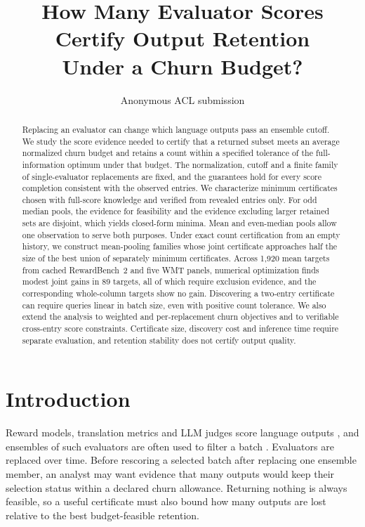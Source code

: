 \documentclass[11pt]{article}
\title{How Many Evaluator Scores Certify Output Retention\\ Under a Churn Budget?}
\author{Anonymous ACL submission}
\begin{document}
\maketitle

\begin{abstract}
Replacing an evaluator can change which language outputs pass an ensemble cutoff. We study the score evidence needed to certify that a returned subset meets an average normalized churn budget and retains a count within a specified tolerance of the full-information optimum under that budget. The normalization, cutoff and a finite family of single-evaluator replacements are fixed, and the guarantees hold for every score completion consistent with the observed entries. We characterize minimum certificates chosen with full-score knowledge and verified from revealed entries only. For odd median pools, the evidence for feasibility and the evidence excluding larger retained sets are disjoint, which yields closed-form minima. Mean and even-median pools allow one observation to serve both purposes. Under exact count certification from an empty history, we construct mean-pooling families whose joint certificate approaches half the size of the best union of separately minimum certificates. Across 1,920 mean targets from cached RewardBench~2 and five WMT panels, numerical optimization finds modest joint gains in 89 targets, all of which require exclusion evidence, and the corresponding whole-column targets show no gain. Discovering a two-entry certificate can require queries linear in batch size, even with positive count tolerance. We also extend the analysis to weighted and per-replacement churn objectives and to verifiable cross-entry score constraints. Certificate size, discovery cost and inference time require separate evaluation, and retention stability does not certify output quality.
\end{abstract}

\section{Introduction}
Reward models, translation metrics and LLM judges score language outputs \citep{malik2026rewardbench2,freitag2023wmt23,zheng2023judging}, and ensembles of such evaluators are often used to filter a batch \citep{coste2024ensembles,eisenstein2024herding}. Evaluators are replaced over time. Before rescoring a selected batch after replacing one ensemble member, an analyst may want evidence that many outputs would keep their selection status within a declared churn allowance. Returning nothing is always feasible, so a useful certificate must also bound how many outputs are lost relative to the best budget-feasible retention.
\end{document}
